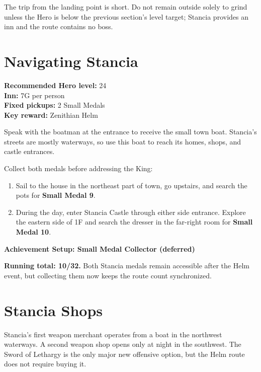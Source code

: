 \documentclass[
  american,
  10pt,
  letterpaper,
  oneside,
  open=any]{scrreprt}
\providecommand{\tightlist}{%
  \setlength{\itemsep}{0pt}\setlength{\parskip}{0pt}}
\begin{document}
The trip from the landing point is short. Do not remain outside solely
to grind unless the Hero is below the previous section's level target;
Stancia provides an inn and the route contains no boss.

\section{Navigating Stancia}\label{navigating-stancia}

\textbf{Recommended Hero level:} 24\\
\textbf{Inn:} 7G per person\\
\textbf{Fixed pickups:} 2 Small Medals\\
\textbf{Key reward:} Zenithian Helm

Speak with the boatman at the entrance to receive the small town boat.
Stancia's streets are mostly waterways, so use this boat to reach its
homes, shops, and castle entrances.

Collect both medals before addressing the King:

\begin{enumerate}
\def\labelenumi{\arabic{enumi}.}
\tightlist
\item
  Sail to the house in the northeast part of town, go upstairs, and
  search the pots for \textbf{Small Medal 9}.
\item
  During the day, enter Stancia Castle through either side entrance.
  Explore the eastern side of 1F and search the dresser in the far-right
  room for \textbf{Small Medal 10}.
\end{enumerate}

\begin{achievementsetup}

\textbf{Achievement Setup: Small Medal Collector (deferred)}

\textbf{Running total: 10/32.} Both Stancia medals remain accessible
after the Helm event, but collecting them now keeps the route count
synchronized.

\end{achievementsetup}

\section{Stancia Shops}\label{stancia-shops}

Stancia's first weapon merchant operates from a boat in the northwest
waterways. A second weapon shop opens only at night in the southwest.
The Sword of Lethargy is the only major new offensive option, but the
Helm route does not require buying it.
\end{document}
